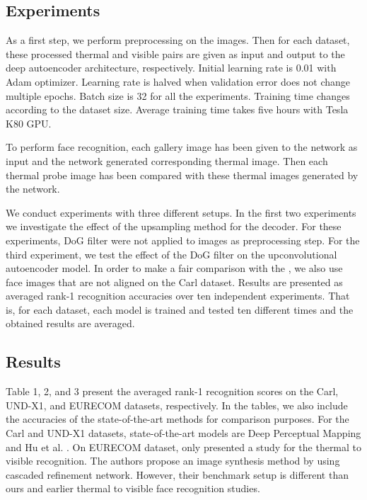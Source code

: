 \documentclass[conference]{IEEEtran}
\begin{document}
\subsection{Experiments}
As a first step, we perform preprocessing on the images. Then for each dataset, these processed thermal and visible pairs are given as input and output to the deep autoencoder architecture, respectively. Initial learning rate is 0.01 with Adam optimizer. Learning rate is halved when validation error does not change multiple epochs. Batch size is 32 for all the experiments. Training time changes according to the dataset size. Average training time takes five hours with Tesla K80 GPU. 

To perform face recognition, each gallery image has been given to the network as input and the network generated corresponding thermal image. Then each thermal probe image has been compared with these thermal images generated by the network.

We conduct experiments with three different setups. In the first two experiments we investigate the effect of the upsampling method for the decoder. For these experiments, DoG filter were not applied to images as preprocessing step. For the third experiment, we test the effect of the DoG filter on the upconvolutional autoencoder model. In order to make a fair comparison with the \cite{deepperceptual}, we also use face images that are not aligned on the Carl dataset. Results are presented as averaged rank-1 recognition accuracies over ten independent experiments. That is, for each dataset, each model is trained and tested ten different times and the obtained results are averaged.

\subsection{Results}

Table 1, 2, and 3 present the averaged rank-1 recognition scores on the Carl, UND-X1, and EURECOM datasets, respectively.
In the tables, we also include the accuracies of the state-of-the-art methods for comparison purposes. For the Carl and UND-X1 datasets, state-of-the-art models are Deep Perceptual Mapping \cite{deepperceptual} and Hu et al. \cite{partialleastsquares}. On EURECOM dataset, only \cite{crossspectrumeurecom} presented a study for the thermal to visible recognition. The authors propose an image synthesis method by using cascaded refinement network. However, their benchmark setup is different than ours and earlier thermal to visible face recognition studies. 
\end{document}
